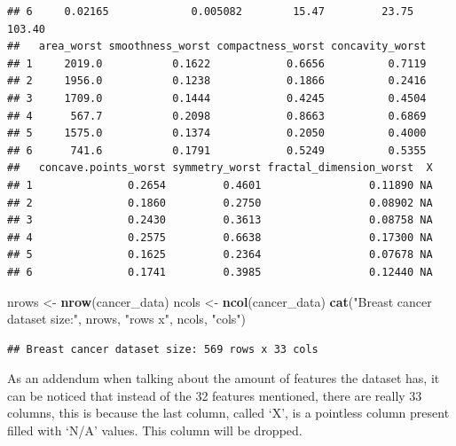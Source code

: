 \documentclass[
]{article}
\newenvironment{Shaded}{\begin{snugshade}}{\end{snugshade}}
\newcommand{\CharTok}[1]{\textcolor[rgb]{0.31,0.60,0.02}{#1}}
\newcommand{\KeywordTok}[1]{\textcolor[rgb]{0.13,0.29,0.53}{\textbf{#1}}}
\newcommand{\NormalTok}[1]{#1}
\newcommand{\OperatorTok}[1]{\textcolor[rgb]{0.81,0.36,0.00}{\textbf{#1}}}
\newcommand{\OtherTok}[1]{\textcolor[rgb]{0.56,0.35,0.01}{#1}}
\newcommand{\StringTok}[1]{\textcolor[rgb]{0.31,0.60,0.02}{#1}}
\begin{document}
\begin{verbatim}
## 6     0.02165             0.005082        15.47         23.75          103.40
##   area_worst smoothness_worst compactness_worst concavity_worst
## 1     2019.0           0.1622            0.6656          0.7119
## 2     1956.0           0.1238            0.1866          0.2416
## 3     1709.0           0.1444            0.4245          0.4504
## 4      567.7           0.2098            0.8663          0.6869
## 5     1575.0           0.1374            0.2050          0.4000
## 6      741.6           0.1791            0.5249          0.5355
##   concave.points_worst symmetry_worst fractal_dimension_worst  X
## 1               0.2654         0.4601                 0.11890 NA
## 2               0.1860         0.2750                 0.08902 NA
## 3               0.2430         0.3613                 0.08758 NA
## 4               0.2575         0.6638                 0.17300 NA
## 5               0.1625         0.2364                 0.07678 NA
## 6               0.1741         0.3985                 0.12440 NA
\end{verbatim}

\begin{Shaded}
\begin{Highlighting}[]
\NormalTok{nrows <-}\StringTok{ }\KeywordTok{nrow}\NormalTok{(cancer_data)}
\NormalTok{ncols <-}\StringTok{ }\KeywordTok{ncol}\NormalTok{(cancer_data)}
\KeywordTok{cat}\NormalTok{(}\StringTok{"Breast cancer dataset size:"}\NormalTok{, nrows, }\StringTok{"rows x"}\NormalTok{, ncols, }\StringTok{"cols"}\NormalTok{)}
\end{Highlighting}
\end{Shaded}

\begin{verbatim}
## Breast cancer dataset size: 569 rows x 33 cols
\end{verbatim}

As an addendum when talking about the amount of features the dataset
has, it can be noticed that instead of the 32 features mentioned, there
are really 33 columns, this is because the last column, called `X', is a
pointless column present filled with `N/A' values. This column will be
dropped.

\begin{Shaded}
\end{Shaded}
\end{document}
